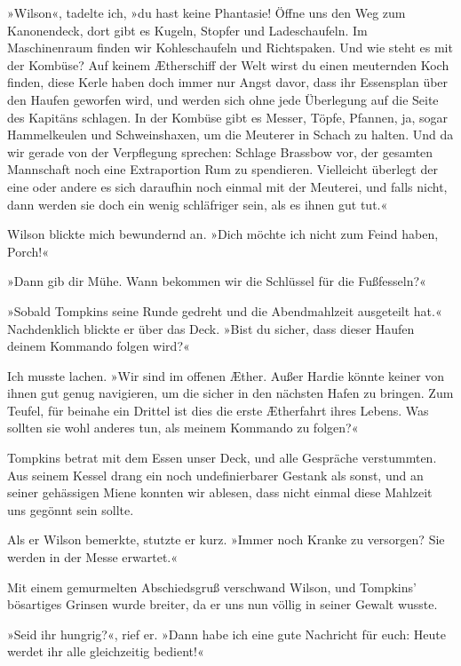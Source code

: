 »Wilson«, tadelte ich, »du hast keine Phantasie! Öffne uns den Weg
zum Kanonendeck, dort gibt es Kugeln, Stopfer und Ladeschaufeln. Im
Maschinenraum finden wir Kohleschaufeln und Richtspaken. Und wie
steht es mit der Kombüse? Auf keinem Ætherschiff der Welt wirst du
einen meuternden Koch finden, diese Kerle haben doch immer nur
Angst davor, dass ihr Essensplan über den Haufen geworfen wird, und
werden sich ohne jede Überlegung auf die Seite des Kapitäns
schlagen. In der Kombüse gibt es Messer, Töpfe, Pfannen, ja, sogar
Hammelkeulen und Schweinshaxen, um die Meuterer in Schach zu
halten. Und da wir gerade von der Verpflegung sprechen: Schlage
Brassbow vor, der gesamten Mannschaft noch eine Extraportion Rum zu
spendieren. Vielleicht überlegt der eine oder andere es sich
daraufhin noch einmal mit der Meuterei, und falls nicht, dann
werden sie doch ein wenig schläfriger sein, als es ihnen gut tut.«

Wilson blickte mich bewundernd an. »Dich möchte ich nicht zum Feind
haben, Porch!«

»Dann gib dir Mühe. Wann bekommen wir die Schlüssel für die
Fußfesseln?«

»Sobald Tompkins seine Runde gedreht und die Abendmahlzeit
ausgeteilt hat.« Nachdenklich blickte er über das Deck. »Bist du
sicher, dass dieser Haufen deinem Kommando folgen wird?«

Ich musste lachen. »Wir sind im offenen Æther. Außer Hardie könnte
keiner von ihnen gut genug navigieren, um die 
sicher in den nächsten Hafen zu bringen. Zum Teufel, für beinahe
ein Drittel ist dies die erste Ætherfahrt ihres Lebens. Was sollten
sie wohl anderes tun, als meinem Kommando zu folgen?«

\bigpar

Tompkins betrat mit dem Essen unser Deck, und alle Gespräche
verstummten. Aus seinem Kessel drang ein noch undefinierbarer
Gestank als sonst, und an seiner gehässigen Miene konnten wir
ablesen, dass nicht einmal diese Mahlzeit uns gegönnt sein sollte.

Als er Wilson bemerkte, stutzte er kurz. »Immer noch Kranke zu
versorgen? Sie werden in der Messe erwartet.«

Mit einem gemurmelten Abschiedsgruß verschwand Wilson, und
Tompkins’ bösartiges Grinsen wurde breiter, da er uns nun völlig in
seiner Gewalt wusste.

»Seid ihr hungrig?«, rief er. »Dann habe ich eine gute Nachricht
für euch: Heute werdet ihr alle gleichzeitig bedient!«

